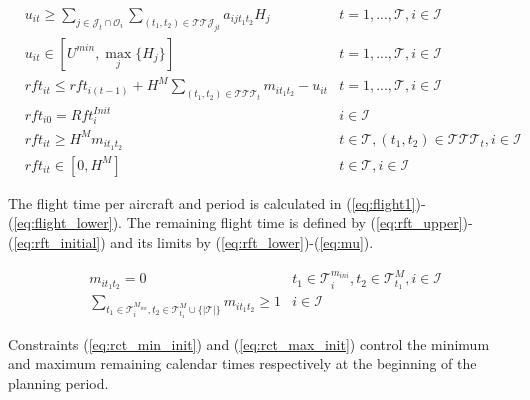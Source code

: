 \documentclass[a4paper,onecolumn,fleqn]{article}
\begin{document}
    \begin{align}
         & u_{it} \geq \sum_{j \in \mathcal{J}_t \cap \mathcal{O}_i} \sum_{(t_1, t_2) \in \mathcal{T}\mathcal{T}\mathcal{J}_{jt}} a_{ijt_1t_2} H_j 
            & t =1, ..., \mathcal{T}, i \in \mathcal{I} \label{eq:flight1}\\
         & u_{it} \in [U^{min}, \max_j{\{H_j\}}]
            & t =1, ..., \mathcal{T}, i \in \mathcal{I} \label{eq:flight_lower}\\
         & rft_{it} \leq rft_{i(t-1)} + H^M \sum_{(t_1, t_2) \in \mathcal{T}\mathcal{T}\mathcal{T}_{t}} m_{it_1t_2} - u_{it}
            & t =1, ..., \mathcal{T}, i \in \mathcal{I} \label{eq:rft_upper}\\
        & rft_{i0} = Rft^{Init}_i
               & i \in \mathcal{I} \label{eq:rft_initial}\\
        & rft_{it} \geq H^M m_{it_1t_2}
                &t \in \mathcal{T}, (t_1, t_2) \in \mathcal{T}\mathcal{T}\mathcal{T}_{t}, i \in \mathcal{I}\label{eq:rft_lower}\\
        & rft_{it} \in [0,H^M]
                & t \in \mathcal{T}, i \in \mathcal{I} \label{eq:mu}
    \end{align}

    The flight time per aircraft and period is calculated in (\ref{eq:flight1})-(\ref{eq:flight_lower}). The remaining flight time is defined by (\ref{eq:rft_upper})-(\ref{eq:rft_initial}) and its limits by (\ref{eq:rft_lower})-(\ref{eq:mu}).

    \begin{align}
        & m_{it_1t_2} = 0
          & t_1 \in \mathcal{T}^{m_{ini}}_i, t_2 \in \mathcal{T}^M_{t_1}, i \in \mathcal{I}\label{eq:rct_min_init} \\
        & \sum_{t_1 \in \mathcal{T}^{M_{ini}}_i, t_2 \in \mathcal{T}^M_{t_1} \cup \{|\mathcal{T}|\} } m_{it_1t_2} \geq  1 
          & i \in \mathcal{I}\label{eq:rct_max_init}
    \end{align}

    Constraints (\ref{eq:rct_min_init}) and (\ref{eq:rct_max_init}) control the minimum and maximum remaining calendar times respectively at the beginning of the planning period. 
\end{document}
